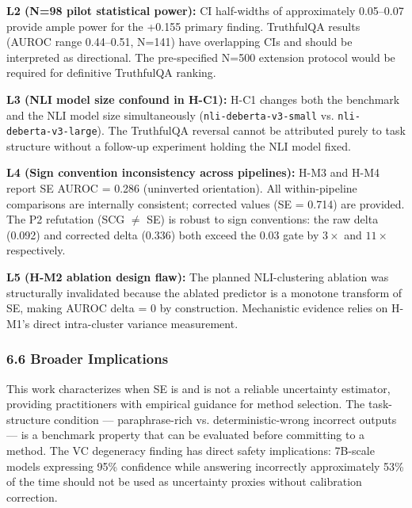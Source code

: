 \textbf{L2 (N=98 pilot statistical power):} CI half-widths of approximately 0.05--0.07 provide ample power for the +0.155 primary finding. TruthfulQA results (AUROC range 0.44--0.51, N=141) have overlapping CIs and should be interpreted as directional. The pre-specified N=500 extension protocol would be required for definitive TruthfulQA ranking.

\textbf{L3 (NLI model size confound in H-C1):} H-C1 changes both the benchmark and the NLI model size simultaneously (\texttt{nli-deberta-v3-small} vs. \texttt{nli-deberta-v3-large}). The TruthfulQA reversal cannot be attributed purely to task structure without a follow-up experiment holding the NLI model fixed.

\textbf{L4 (Sign convention inconsistency across pipelines):} H-M3 and H-M4 report SE AUROC = 0.286 (uninverted orientation). All within-pipeline comparisons are internally consistent; corrected values (SE = 0.714) are provided. The P2 refutation (SCG $\neq$ SE) is robust to sign conventions: the raw delta (0.092) and corrected delta (0.336) both exceed the 0.03 gate by $3\times$ and $11\times$ respectively.

\textbf{L5 (H-M2 ablation design flaw):} The planned NLI-clustering ablation was structurally invalidated because the ablated predictor is a monotone transform of SE, making AUROC delta = 0 by construction. Mechanistic evidence relies on H-M1's direct intra-cluster variance measurement.

\subsubsection{6.6 Broader Implications}

This work characterizes when SE is and is not a reliable uncertainty estimator, providing practitioners with empirical guidance for method selection. The task-structure condition --- paraphrase-rich vs. deterministic-wrong incorrect outputs --- is a benchmark property that can be evaluated before committing to a method. The VC degeneracy finding has direct safety implications: 7B-scale models expressing 95\% confidence while answering incorrectly approximately 53\% of the time should not be used as uncertainty proxies without calibration correction.

